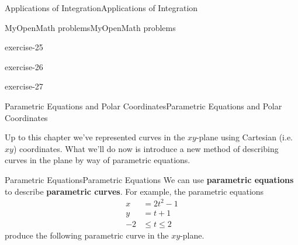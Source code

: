 \documentclass[10pt,]{book}
\newcommand{\terminology}[1]{\textbf{#1}}
\numberwithin{equation}{section}
\begin{document}
\begin{chapterptx}{Applications of Integration}{}{Applications of Integration}{}{}
\begin{exercises-section}{MyOpenMath problems}{}{MyOpenMath problems}{}{}
\begin{exercisegroup}{1}
\begin{divisionexercise}{25}{}{}{exercise-25}
\end{divisionexercise}%
\begin{divisionexercise}{26}{}{}{exercise-26}%
\end{divisionexercise}%
\begin{divisionexercise}{27}{}{}{exercise-27}%
\end{divisionexercise}%
\end{exercisegroup}
\par\medskip\noindent
\end{exercises-section}
\end{chapterptx}
%
%
\typeout{************************************************}
\typeout{************************************************}
%
\begin{chapterptx}{Parametric Equations and Polar Coordinates}{}{Parametric Equations and Polar Coordinates}{}{}\label{parametric-polar}
\begin{introduction}{}%
\hypertarget{p-777}{}%
Up to this chapter we've represented curves in the \(xy\)-plane using Cartesian (i.e. \(xy\)) coordinates. What we'll do now is introduce a new method of describing curves in the plane by way of parametric equations.%
\end{introduction}%
%
%
\typeout{************************************************}
\typeout{************************************************}
%
\begin{sectionptx}{Parametric Equations}{}{Parametric Equations}{}{}\label{section-parametric-equations}
\hypertarget{p-778}{}%
We can use \terminology{parametric equations} to describe \terminology{parametric curves}. For example, the parametric equations%
%
\begin{align*}
x & = 2t^{2}-1 \\
y & = t+1 \\
-2 & \leq t\leq 2 
\end{align*}
\hypertarget{p-779}{}%
produce the following parametric curve in the \(xy\)-plane.%
\begin{figure}
\centering
{
    }
\end{figure}
\end{sectionptx}
\end{chapterptx}
\end{document}
